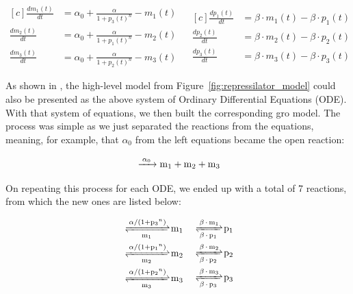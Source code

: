 \documentclass[12pt]{article}
\begin{document}
    \begin{equation}
    \begin{aligned}[c]
        \frac{dm_{1}(t)}{dt} & = \alpha_{0} + \frac{\alpha}{1 + p_{3}(t)^{n}} - m_{1}(t) & \\
        \frac{dm_{2}(t)}{dt} & = \alpha_{0} + \frac{\alpha}{1 + p_{1}(t)^{n}} - m_{2}(t) & \\
        \frac{dm_{3}(t)}{dt} & = \alpha_{0} + \frac{\alpha}{1 + p_{2}(t)^{n}} - m_{3}(t) &
    \end{aligned}
    \begin{aligned}[c]
        \frac{dp_{1}(t)}{dt} & = \beta \cdot m_{1}(t) - \beta \cdot p_{1}(t) \\
        \frac{dp_{2}(t)}{dt} & = \beta \cdot m_{2}(t) - \beta \cdot p_{2}(t) \\
        \frac{dp_{3}(t)}{dt} & = \beta \cdot m_{3}(t) - \beta \cdot p_{3}(t)
    \end{aligned}
    \end{equation}

    As shown in \cite{Elowitz2000}, the high-level model from Figure~\ref{fig:repressilator_model} could also be presented as the above system of Ordinary Differential Equations (ODE). With that system of equations, we then built the corresponding gro model. The process was simple as we just separated the reactions from the equations, meaning, for example, that $\alpha_{0}$ from the left equations became the open reaction:
    
    \begin{equation}
    \ce{ ->[\alpha_{0}] m_{1} + m_{2} + m_{3}}
    \end{equation}
    
    On repeating this process for each ODE, we ended up with a total of 7 reactions, from which the new ones are listed below:
    
    \begin{equation}
    \begin{aligned}[c]
        \ce{ <=>[\alpha/(1 + p_{3}^n)][m_{1}] m_{1}} & & \\
        \ce{ <=>[\alpha/(1 + p_{1}^n)][m_{2}] m_{2}} & & \\
        \ce{ <=>[\alpha/(1 + p_{2}^n)][m_{3}] m_{3}} & &
    \end{aligned}
    \begin{aligned}[c]
        \ce{ <=>[\beta*m_{1}][\beta*p_{1}] p_{1}} \\
        \ce{ <=>[\beta*m_{2}][\beta*p_{2}] p_{2}} \\
        \ce{ <=>[\beta*m_{3}][\beta*p_{3}] p_{3}}
    \end{aligned}
    \end{equation}
    
\end{document}

